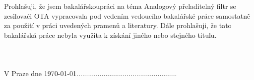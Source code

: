 \vspace{18cm}

Prohlašuji, že jsem bakalářskoupráci na téma Analogový  přeladitelný filtr se zesilovači OTA vypracovala pod vedením vedoucího bakalářské práce samostatně za použití v práci uvedených pramenů a literatury. Dále prohlašuji, že tato bakalářská práce nebyla využita k získání jiného nebo stejného titulu.\\
\\
\\
\\
V Praze dne \today \hfill \hfill ....................................................
